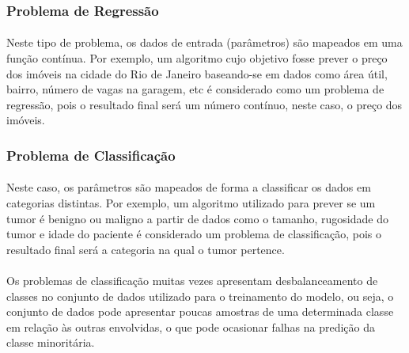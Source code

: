 \documentclass[grad,numbers]{coppe}
\begin{document}
  		\subsubsection{Problema de Regressão}
	  		\paragraph{}Neste tipo de problema, os dados de entrada (parâmetros) são mapeados em uma função contínua. Por exemplo, um algoritmo cujo objetivo fosse prever o preço dos imóveis na cidade do Rio de Janeiro baseando-se em dados como área útil, bairro, número de vagas na garagem, etc é considerado como um problema de regressão, pois o resultado final será um número contínuo, neste caso, o preço dos imóveis.
  		\subsubsection{Problema de Classificação}
  			\paragraph{}Neste caso, os parâmetros são mapeados de forma a classificar os dados em categorias distintas. Por exemplo, um algoritmo utilizado para prever se um tumor é benigno ou maligno a partir de dados como o tamanho, rugosidade do tumor e idade do paciente é considerado um problema de classificação, pois o resultado final será a categoria na qual o tumor pertence.
  			\paragraph{}Os problemas de classificação muitas vezes apresentam desbalanceamento de classes no conjunto de dados utilizado para o treinamento do modelo, ou seja, o conjunto de dados pode apresentar poucas amostras de uma determinada classe em relação às outras envolvidas, o que pode ocasionar falhas na predição da classe minoritária.
\end{document}
